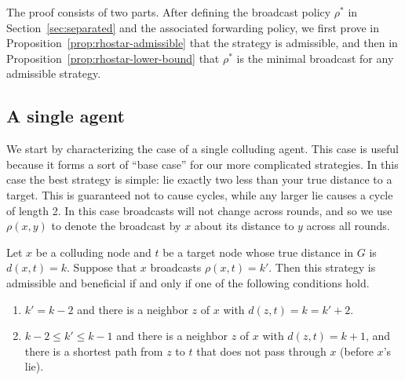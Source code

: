 \documentclass[prodmode,acmec]{ec-acmsmall}
\begin{document}
The proof consists of two parts. After defining the broadcast policy
$\rho^*$ in Section~\ref{sec:separated} and the associated forwarding
policy, we first prove in Proposition~\ref{prop:rhostar-admissible} that the
strategy is admissible, and then in Proposition~\ref{prop:rhostar-lower-bound}
that $\rho^*$ is the minimal broadcast for any admissible strategy.

\subsection{A single agent} \label{sec:single-agent}

We start by characterizing the case of a single colluding agent. This case is
useful because it forms a sort of ``base case'' for our more complicated
strategies. In this case the best strategy is simple: lie exactly two less than
your true distance to a target. This is guaranteed not to cause cycles, while
any larger lie causes a cycle of length 2. In this case broadcasts will not
change across rounds, and so we use $\rho(x,y)$ to denote the broadcast by $x$
about its distance to $y$ across all rounds.

\begin{theorem} \label{thm:single-agent}

Let $x$ be a colluding node and $t$ be a target node whose true distance in $G$
is $d(x,t) = k$. Suppose that $x$ broadcasts $\rho(x,t) = k'$. Then this
strategy is admissible and beneficial if and only if one of the following
conditions hold.

\begin{enumerate}
   \item $k' = k - 2$ and there is a neighbor $z$ of $x$ with $d(z,t) = k = k'
+ 2$.
   \item $k-2 \leq k' \leq k-1$ and there is a neighbor $z$ of $x$ with $d(z,t)
= k + 1$, and there is a shortest path from $z$ to $t$ that does not pass
through $x$ (before $x$'s lie).
\end{enumerate}

\end{theorem}
\end{document}
